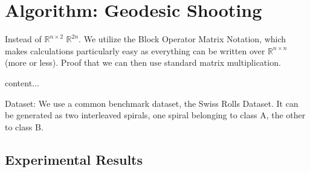\section{Algorithm: Geodesic Shooting}

Instead of $\mathbb{R}^{n\times2}$ $\mathbb{R}^{2n}$.
We utilize the Block Operator Matrix Notation, which makes calculations particularly easy as everything can be written over $\mathbb{R}^{n\times n}$ (more or less).
Proof that we can then use standard matrix multiplication.

\begin{definition}
	content...
\end{definition}

Dataset: We use a common benchmark dataset, the Swiss Rolls Dataset.
It can be generated as two interleaved spirals, one spiral belonging to class A, the other to class B.

\subsection{Experimental Results}